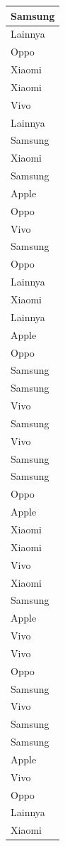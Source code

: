 \documentclass[
  letterpaper,
  DIV=11,
  numbers=noendperiod]{scrartcl}
\begin{document}
\begin{table}
\begin{tabular}[t]{l}
\hline
Samsung\\
\hline
Lainnya\\
\hline
Oppo\\
\hline
Xiaomi\\
\hline
Xiaomi\\
\hline
Vivo\\
\hline
Lainnya\\
\hline
Samsung\\
\hline
Xiaomi\\
\hline
Samsung\\
\hline
Apple\\
\hline
Oppo\\
\hline
Vivo\\
\hline
Samsung\\
\hline
Oppo\\
\hline
Lainnya\\
\hline
Xiaomi\\
\hline
Lainnya\\
\hline
Apple\\
\hline
Oppo\\
\hline
Samsung\\
\hline
Samsung\\
\hline
Vivo\\
\hline
Samsung\\
\hline
Vivo\\
\hline
Samsung\\
\hline
Samsung\\
\hline
Oppo\\
\hline
Apple\\
\hline
Xiaomi\\
\hline
Xiaomi\\
\hline
Vivo\\
\hline
Xiaomi\\
\hline
Samsung\\
\hline
Apple\\
\hline
Vivo\\
\hline
Vivo\\
\hline
Oppo\\
\hline
Samsung\\
\hline
Vivo\\
\hline
Samsung\\
\hline
Samsung\\
\hline
Apple\\
\hline
Vivo\\
\hline
Oppo\\
\hline
Lainnya\\
\hline
Xiaomi\\

\end{tabular}
\end{table}
\end{document}
